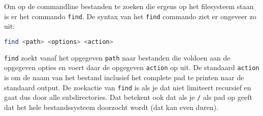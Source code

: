 Om op de commandline bestanden te zoeken die ergens op het filesysteem staan is er het commando \texttt{find}. De syntax van het \texttt{find} commando ziet er ongeveer zo uit:
\begin{lstlisting}[language=bash]
find <path> <options> <action>
\end{lstlisting}
\texttt{find} zoekt vanaf het opgegeven \texttt{path} naar bestanden die voldoen aan de opgegeven opties en voert daar de opgegeven \texttt{action} op uit. De standaard \texttt{action} is om de naam van het bestand inclusief het complete pad te printen naar de standaard output. De zoekactie van \texttt{find} is als je dat niet limiteert recursief en gaat dus door alle subdirectories. Dat betekent ook dat als je \texttt{/} als pad op geeft dat het hele bestandssysteem doorzocht wordt (dat kan even duren).

